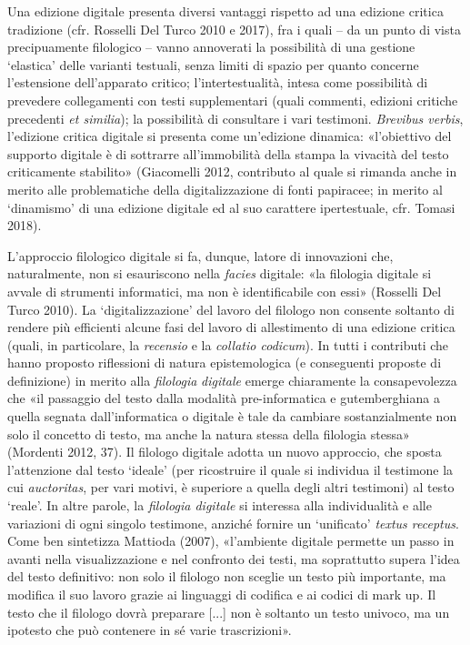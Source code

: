 {Una edizione digitale presenta diversi vantaggi rispetto ad una edizione
critica tradizione (cfr. Rosselli Del Turco 2010 e 2017), fra i quali --
da un punto di vista precipuamente filologico -- vanno annoverati la
possibilità di una gestione `elastica' delle varianti testuali, senza
limiti di spazio per quanto concerne l'estensione dell'apparato critico;
l'intertestualità, intesa come possibilità di prevedere collegamenti con
testi supplementari (quali commenti, edizioni critiche precedenti
\emph{et similia}); la possibilità di consultare i vari testimoni.
\emph{Brevibus verbis}, l'edizione critica digitale si presenta come
un'edizione dinamica: «l'obiettivo del supporto digitale è di sottrarre
all'immobilità della stampa la vivacità del testo criticamente
stabilito» (Giacomelli 2012, contributo al quale si rimanda anche in
merito alle problematiche della digitalizzazione di fonti papiracee; in
merito al `dinamismo' di una edizione digitale ed al suo carattere
ipertestuale, cfr. Tomasi 2018).

L'approccio filologico digitale si fa, dunque, latore di innovazioni
che, naturalmente, non si esauriscono nella \emph{facies} digitale: «la
filologia digitale si avvale di strumenti informatici, ma non è
identificabile con essi» (Rosselli Del Turco 2010). La
`digitalizzazione' del lavoro del filologo non consente soltanto di
rendere più efficienti alcune fasi del lavoro di allestimento di una
edizione critica (quali, in particolare, la \emph{recensio} e la
\emph{collatio codicum}). In tutti i contributi che hanno proposto
riflessioni di natura epistemologica (e conseguenti proposte di
definizione) in merito alla \emph{filologia} \emph{digitale} emerge
chiaramente la consapevolezza che «il passaggio del testo dalla modalità
pre-informatica e gutemberghiana a quella segnata dall'informatica o
digitale è tale da cambiare sostanzialmente non solo il concetto di
testo, ma anche la natura stessa della filologia stessa» (Mordenti 2012,
37). Il filologo digitale adotta un nuovo approccio, che sposta
l'attenzione dal testo `ideale' (per ricostruire il quale si individua
il testimone la cui \emph{auctoritas}, per vari motivi, è superiore a
quella degli altri testimoni) al testo `reale'. In altre parole, la
\emph{filologia digitale} si interessa alla individualità e alle
variazioni di ogni singolo testimone, anziché fornire un `unificato'
\emph{textus receptus}. Come ben sintetizza Mattioda (2007), «l'ambiente
digitale permette un passo in avanti nella visualizzazione e nel
confronto dei testi, ma soprattutto supera l'idea del testo definitivo:
non solo il filologo non sceglie un testo più importante, ma modifica il
suo lavoro grazie ai linguaggi di codifica e ai codici di mark
up\emph{.} Il testo che il filologo dovrà preparare {[}...{]} non è
soltanto un testo univoco, ma un ipotesto che può contenere in sé varie
trascrizioni».

}

